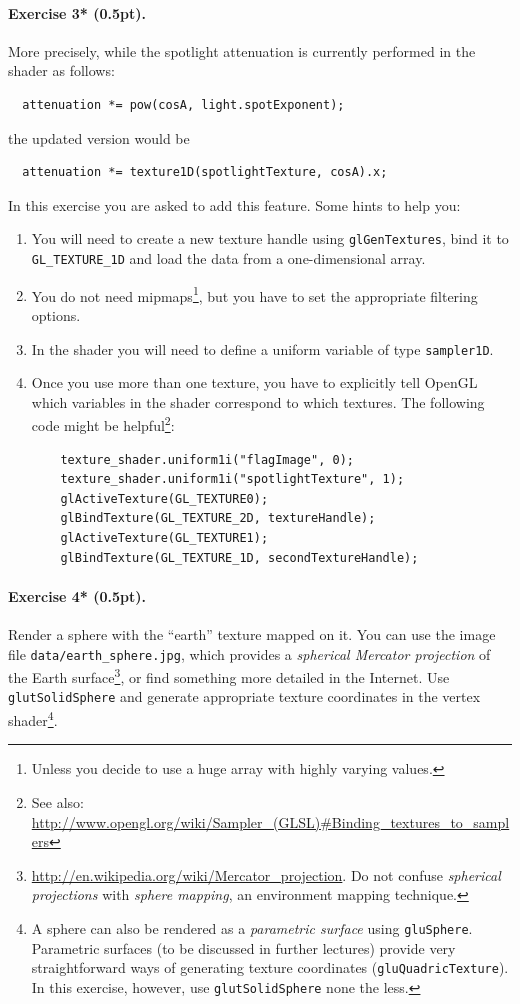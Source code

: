 \documentclass{article}
\newenvironment{exercise}[2]{\paragraph{Exercise #1 (#2pt).} }{
\medskip}
\begin{document}
\begin{exercise}{3*}{0.5}
More precisely, while the spotlight attenuation is currently performed in the shader as follows:
\begin{verbatim}
  attenuation *= pow(cosA, light.spotExponent);
\end{verbatim}
the updated version would be 
\begin{verbatim}
  attenuation *= texture1D(spotlightTexture, cosA).x;
\end{verbatim}
In this exercise you are asked to add this feature. Some hints to help you:
\begin{enumerate}
\item You will need to create a new texture handle using \texttt{glGenTextures}, bind it to \verb#GL_TEXTURE_1D# and load the data from a one-dimensional array. \item You do not need mipmaps\footnote{Unless you decide to use a huge array with highly varying values.}, but you have to set the appropriate filtering options.
\item In the shader you will need to define a uniform variable of type \texttt{sampler1D}.
\item Once you use more than one texture, you have to explicitly tell OpenGL which variables in the shader correspond to which textures. The following code might be helpful\footnote{See also: \url{http://www.opengl.org/wiki/Sampler_(GLSL)\#Binding_textures_to_samplers}}:
\begin{verbatim}
    texture_shader.uniform1i("flagImage", 0);
    texture_shader.uniform1i("spotlightTexture", 1);
    glActiveTexture(GL_TEXTURE0);
    glBindTexture(GL_TEXTURE_2D, textureHandle);
    glActiveTexture(GL_TEXTURE1);
    glBindTexture(GL_TEXTURE_1D, secondTextureHandle);
\end{verbatim}
\end{enumerate}
\end{exercise}

\newpage
\begin{exercise}{4*}{0.5}
Render a sphere with the ``earth'' texture mapped on it. You can use the image file \verb#data/earth_sphere.jpg#, which provides a \emph{spherical Mercator projection} of the Earth surface\footnote{\url{http://en.wikipedia.org/wiki/Mercator_projection}. Do not confuse \emph{spherical projections} with \emph{sphere mapping}, an environment mapping technique.}, or find something more detailed in the Internet. Use \texttt{glutSolidSphere} and generate appropriate texture coordinates in the vertex shader\footnote{A sphere can also be rendered as a \emph{parametric surface} using \texttt{gluSphere}. Parametric surfaces (to be discussed in further lectures) provide very straightforward ways of generating texture coordinates (\texttt{gluQuadricTexture}). In this exercise, however, use \texttt{glutSolidSphere} none the less.}.
\end{exercise}
\end{document}
